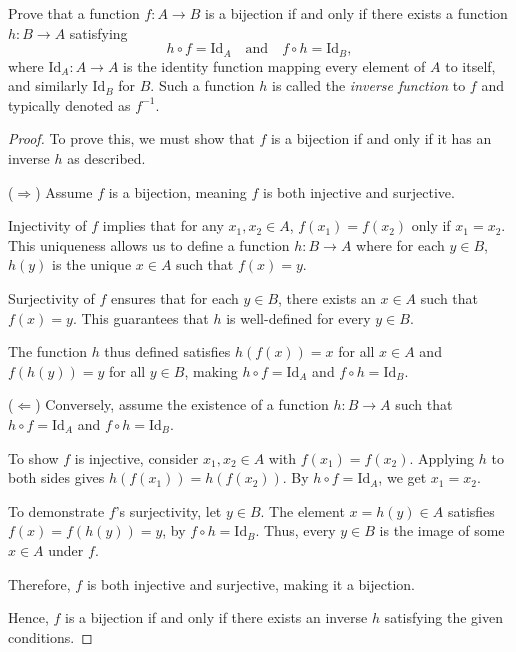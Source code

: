 \documentclass[10pt]{article}
\newenvironment{problem}[2][Problem]{\begin{trivlist}
\item[\hskip \labelsep {\bfseries #1}\hskip \labelsep {\bfseries #2.}]}{\end{trivlist}}
\begin{document}
\newpage
\begin{problem}{3}
    Prove that a function \( f: A \to B \) is a bijection if and only if there exists a function \( h: B \to A \) satisfying
    \[ h \circ f = \text{Id}_A \quad \text{and}\quad f \circ h = \text{Id}_B, \]
    where \( \text{Id}_A: A \to A \) is the identity function mapping every element of \( A \) to itself, and similarly \( \text{Id}_B \) for \( B \). Such a function \( h \) is called the \emph{inverse function} to \( f \) and typically denoted as \( f^{-1} \).

    \begin{proof}
        To prove this, we must show that \( f \) is a bijection if and only if it has an inverse \( h \) as described.

        (\(\Rightarrow\)) Assume \( f \) is a bijection, meaning \( f \) is both injective and surjective.

        Injectivity of \( f \) implies that for any \( x_1, x_2 \in A \), \( f(x_1) = f(x_2) \) only if \( x_1 = x_2 \). This uniqueness allows us to define a function \( h: B \to A \) where for each \( y \in B \), \( h(y) \) is the unique \( x \in A \) such that \( f(x) = y \).

        Surjectivity of \( f \) ensures that for each \( y \in B \), there exists an \( x \in A \) such that \( f(x) = y \). This guarantees that \( h \) is well-defined for every \( y \in B \).

        The function \( h \) thus defined satisfies \( h(f(x)) = x \) for all \( x \in A \) and \( f(h(y)) = y \) for all \( y \in B \), making \( h \circ f = \text{Id}_A \) and \( f \circ h = \text{Id}_B \).

        (\(\Leftarrow\)) Conversely, assume the existence of a function \( h: B \to A \) such that \( h \circ f = \text{Id}_A \) and \( f \circ h = \text{Id}_B \).

        To show \( f \) is injective, consider \( x_1, x_2 \in A \) with \( f(x_1) = f(x_2) \). Applying \( h \) to both sides gives \( h(f(x_1)) = h(f(x_2)) \). By \( h \circ f = \text{Id}_A \), we get \( x_1 = x_2 \).

        To demonstrate \( f \)'s surjectivity, let \( y \in B \). The element \( x = h(y) \in A \) satisfies \( f(x) = f(h(y)) = y \), by \( f \circ h = \text{Id}_B \). Thus, every \( y \in B \) is the image of some \( x \in A \) under \( f \).

        Therefore, \( f \) is both injective and surjective, making it a bijection.

        Hence, \( f \) is a bijection if and only if there exists an inverse \( h \) satisfying the given conditions.
    \end{proof}
\end{problem}
\end{document}
